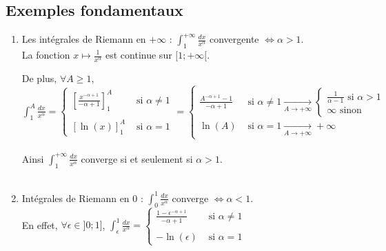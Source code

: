 \documentclass[a4paper,10pt]{book} %
\newcommand{\displayAmath}{\displaystyle}
\begin{document}
\subsection{Exemples fondamentaux}
\begin{enumerate}
\item Les intégrales de Riemann en $+\infty$ :
$\displayAmath\int_1^{+\infty}\frac{dx}{x^\alpha}$ convergente $\Leftrightarrow \alpha>1$.\\

La fonction $x\mapsto\frac{1}{x^\alpha}$ est continue sur $[1;+\infty[$.\\\smallskip

De plus, $\forall A\geq 1$, $\displayAmath\int_{1}^{A}\frac{dx}{x^\alpha}=\left\{\begin{array}{ccl}
\displayAmath \left[\frac{x^{-\alpha+1}}{-\alpha+1}\right]_1^A&\text{ si }\alpha\neq 1\\\\
\left[ \ln (x) \right]_1^A&\text{ si }\alpha=1
\end{array}\right.=\left\{\begin{array}{rll}
\displayAmath\frac{A^{-\alpha+1}-1}{-\alpha+1}&\text{ si }\alpha\neq 1 \underset{A\rightarrow +\infty}{\rightarrow}
\left\{\begin{array}{c}
\frac{1}{\alpha-1}\text{ si }\alpha>1\\
\infty \text{ sinon }
\end{array}\right.\\
\ln(A) &\text{ si }\alpha=1 \underset{A\rightarrow +\infty}{\rightarrow}+\infty
\end{array}\right.$\\\\

Ainsi $\displayAmath\int_1^{+\infty} \frac{dx}{x^{\alpha}}$ converge si et seulement si $\alpha>1$.\\\\

\item Intégrales de Riemann en 0 :
$\displayAmath\int_0^1\frac{dx}{x^\alpha}$ converge $\Leftrightarrow \alpha<1$.\\

En effet, $\forall \epsilon \in ]0;1]$, $\displayAmath\int_\epsilon^1\frac{dx}{x^\alpha}=\left\{\begin{array}{rcl}
\displayAmath\frac{1-\epsilon^{-\alpha+1}}{-\alpha+1} &\text{ si }\alpha\neq 1\\\\
-\ln(\epsilon) &\text{ si }\alpha=1
\end{array}\right.$\\


\end{enumerate}
\end{document}
